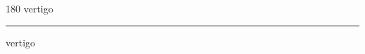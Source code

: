 
\begin{frame}
\begin{center}
\begin{turn}{180}
{\fontsize{2.5cm}{1em}\selectfont vertigo}
\end{turn}
\vspace{1em}\par  
\hrule
\vspace{1em}\par  
{\fontsize{2.5cm}{1em}\selectfont vertigo}
\end{center}
\end{frame}
